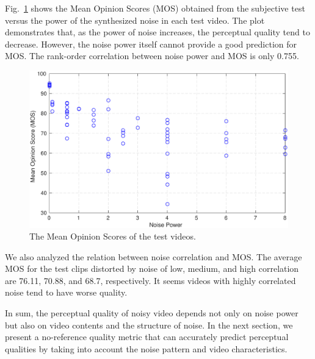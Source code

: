 \documentclass{sig-alternate}
\begin{document}
Fig.~\ref{fig:mos} shows the Mean Opinion Scores (MOS) obtained from the subjective test versus the power of the synthesized noise in each test video. The plot demonstrates that, as the power of noise increases, the perceptual quality tend to decrease. However, the noise power itself cannot provide a good prediction for MOS. The rank-order correlation between noise power and MOS is only 0.755.  
\begin{figure}[!hb]
	\centering
	\includegraphics[width=\columnwidth]{img/MOS.eps}
	\caption{\label{fig:mos} The Mean Opinion Scores of the test videos.}
\end{figure}

We also analyzed the relation between noise correlation and MOS. The average MOS for the test clips distorted by noise of low, medium, and high correlation are 76.11, 70.88, and 68.7, respectively. It seems videos with highly correlated noise tend to have worse quality. 

In sum, the perceptual quality of noisy video depends not only on noise power but also on video contents and the structure of noise. In the next section, we present a no-reference quality metric that can accurately predict perceptual qualities by taking into account the noise pattern and video characteristics.
\end{document}
